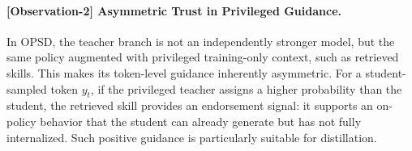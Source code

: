 \documentclass{llmxive}
\begin{document}

\paragraph{[Observation-2] Asymmetric Trust in Privileged Guidance.}
In OPSD, the teacher branch is not an independently stronger model, but the same policy augmented with privileged training-only context, such as retrieved skills. 
This makes its token-level guidance inherently asymmetric. 
For a student-sampled token $y_t$, if the privileged teacher assigns a higher probability than the student, the retrieved skill provides an endorsement signal: it supports an on-policy behavior that the student can already generate but has not fully internalized. 
Such positive guidance is particularly suitable for distillation.
\end{document}
